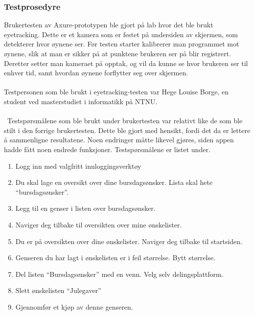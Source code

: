 \subsubsection{Testprosedyre}
Brukertesten av Axure-prototypen ble gjort på lab hvor det ble brukt eyetracking. Dette er et kamera som er festet på undersiden av skjermen, som detekterer hvor øynene ser. Før testen starter kalibrerer man programmet mot øynene, slik at man er sikker på at punktene brukeren ser på blir registrert. Deretter setter man kameraet på opptak, og vil da kunne se hvor brukeren ser til enhver tid, samt hvordan øynene forflytter seg over skjermen.
\\\\
Testpersonen som ble brukt i eyetracking-testen var Hege Louise Borge, en student ved masterstudiet i informatikk på NTNU. 
\\\\\
Testspørsmålene som ble brukt under brukertesten var relativt like de som ble stilt i den forrige brukertesten. Dette ble gjort med hensikt, fordi det da er lettere å sammenligne resultatene. Noen endringer måtte likevel gjøres, siden appen hadde fått noen endrede funksjoner. Testspørsmålene er listet under.

\begin{enumerate}
    \item Logg inn med valgfritt innloggingsverktøy
    \item Du skal lage en oversikt over dine bursdagsønsker. Lista skal hete “bursdagsønsker”.
    \item Legg til en genser i listen over bursdagsønsker.
    \item Naviger deg tilbake til oversikten over mine ønskelister.
    \item Du er på oversikten over dine ønskelister. Naviger deg tilbake til startsiden.
    \item Genseren du har lagt i ønskelisten er i feil størrelse. Bytt størrelse.
    \item Del listen “Bursdagsønsker” med en venn. Velg selv delingsplattform.
    \item Slett ønskelisten “Julegaver”
    \item Gjennomfør et kjøp av denne genseren.
\end{enumerate}

